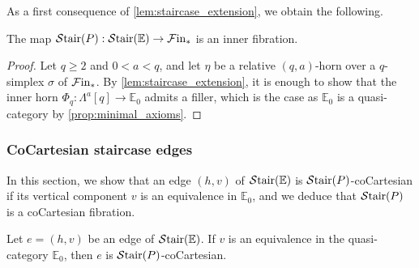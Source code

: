 \documentclass[10pt,reqno]{amsart}
\begin{document}
As a first consequence of \cref{lem:staircase_extension}, we obtain
the following.

\begin{theorem}
\label{thm:staircase_inner_fibration}
The map $\mathcal{S}\mathrm{tair}(P):\mathcal{S}\mathrm{tair}(\mathbb E)\to \mathcal{F}\mathrm{in}_*$ is an inner fibration.
\end{theorem}

\begin{proof}
Let $q\geq2$ and $0<a<q$, and let $\eta$ be a relative
$(q,a)$-horn over a $q$-simplex $\sigma$ of $\mathcal{F}\mathrm{in}_*$. By
\cref{lem:staircase_extension}, it is enough to show that the inner
horn $\Phi_q:\Lambda^a[q]\to\mathbb E_0$ admits a filler, which is
the case as $\mathbb E_0$ is a quasi-category by
\cref{prop:minimal_axioms}.
\end{proof}

\subsubsection{CoCartesian staircase edges}
\label{subsubsec:cocartesian_staircase_edges}

In this section, we show that an edge $(h,v)$ of
$\mathcal{S}\mathrm{tair}(\mathbb E)$ is $\mathcal{S}\mathrm{tair}(P)$-coCartesian if its vertical
component $v$ is an equivalence in $\mathbb E_0$, and we deduce
that $\mathcal{S}\mathrm{tair}(P)$ is a coCartesian fibration.

\begin{proposition}
\label{prop:cocartesian_staircase_edges}
Let $e=(h,v)$ be an edge of $\mathcal{S}\mathrm{tair}(\mathbb E)$. If $v$ is an
equivalence in the quasi-category $\mathbb E_0$, then $e$ is
$\mathcal{S}\mathrm{tair}(P)$-coCartesian.
\end{proposition}
\end{document}
